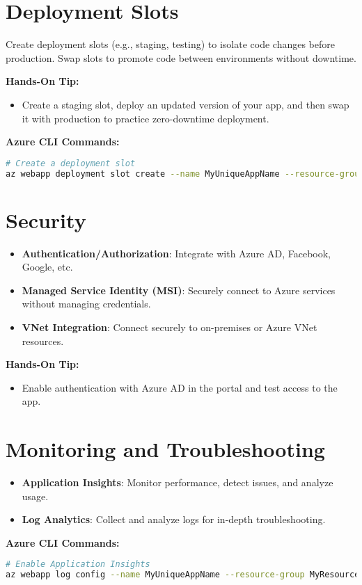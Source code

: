 \documentclass{article}
\begin{document}
\section{Deployment Slots}
Create deployment slots (e.g., staging, testing) to isolate code changes before production. Swap slots to promote code between environments without downtime.

\textbf{Hands-On Tip:}
\begin{itemize}
    \item Create a staging slot, deploy an updated version of your app, and then swap it with production to practice zero-downtime deployment.
\end{itemize}

\textbf{Azure CLI Commands:}
\begin{lstlisting}[language=bash]
# Create a deployment slot
az webapp deployment slot create --name MyUniqueAppName --resource-group MyResourceGroup --slot staging
\end{lstlisting}

\section{Security}
\begin{itemize}
    \item \textbf{Authentication/Authorization}: Integrate with Azure AD, Facebook, Google, etc.
    \item \textbf{Managed Service Identity (MSI)}: Securely connect to Azure services without managing credentials.
    \item \textbf{VNet Integration}: Connect securely to on-premises or Azure VNet resources.
\end{itemize}

\textbf{Hands-On Tip:}
\begin{itemize}
    \item Enable authentication with Azure AD in the portal and test access to the app.
\end{itemize}

\section{Monitoring and Troubleshooting}
\begin{itemize}
    \item \textbf{Application Insights}: Monitor performance, detect issues, and analyze usage.
    \item \textbf{Log Analytics}: Collect and analyze logs for in-depth troubleshooting.
\end{itemize}

\textbf{Azure CLI Commands:}
\begin{lstlisting}[language=bash]
# Enable Application Insights
az webapp log config --name MyUniqueAppName --resource-group MyResourceGroup --application-logging filesystem
\end{lstlisting}
\end{document}

